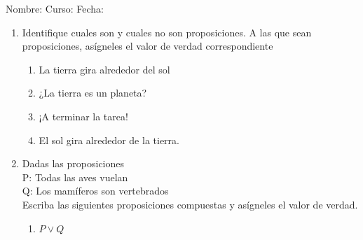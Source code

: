 \documentclass[letterpaper,fleqn]{article}
\newcommand{\LineaNombre}{%
\par
\vspace{\baselineskip}
Nombre:\hrulefill \; Curso: \underline{\hspace*{48pt}} \; Fecha: \underline{\hspace*{2.5cm}} \relax
\par}
\begin{document}
\LineaNombre
\begin{enumerate}
 \item Identifique cuales son y cuales no son proposiciones. A las que sean proposiciones, as\'{i}gneles el valor de verdad correspondiente
 \begin{enumerate}
 \item La tierra gira alrededor del sol
 \item ¿La tierra es un planeta?
 \item ¡A terminar la tarea!
 \item El sol gira alrededor de la tierra.
 \end{enumerate}
 \item Dadas las proposiciones\\
 P: Todas las aves vuelan\\
 Q: Los mamíferos son vertebrados\\
Escriba las siguientes proposiciones compuestas y asígneles el valor de verdad.
\begin{enumerate}
\item $P\vee Q$
\end{enumerate}
 \end{enumerate}
\end{document}
